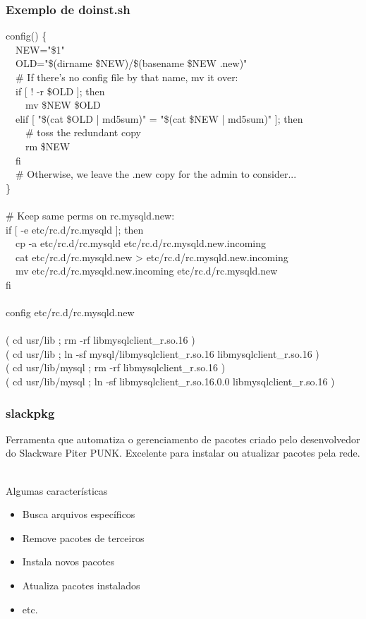 \documentclass{beamer}
\begin{document}
\begin{frame}
	\frametitle{Exemplo de doinst.sh}
	\scriptsize{
	\tiny{
	config() \{\\
  	~~NEW="\$1"\\
	~~OLD="\$(dirname \$NEW)/\$(basename \$NEW .new)"\\
	~~\# If there's no config file by that name, mv it over:\\
	~~if [ ! -r \$OLD ]; then\\
	~~~~mv \$NEW \$OLD\\
	~~elif [ "\$(cat \$OLD | md5sum)" = "\$(cat \$NEW | md5sum)" ]; then\\
        ~~~~\# toss the redundant copy\\
    	~~~~rm \$NEW\\
  	~~fi\\
  	~~\# Otherwise, we leave the .new copy for the admin to consider...\\
\}\\
~\\
	\# Keep same perms on rc.mysqld.new:\\
	if [ -e etc/rc.d/rc.mysqld ]; then\\
	~~cp -a etc/rc.d/rc.mysqld etc/rc.d/rc.mysqld.new.incoming\\
	~~cat etc/rc.d/rc.mysqld.new > etc/rc.d/rc.mysqld.new.incoming\\
	~~mv etc/rc.d/rc.mysqld.new.incoming etc/rc.d/rc.mysqld.new\\
	fi\\
~\\
	config etc/rc.d/rc.mysqld.new\\
~\\
	( cd usr/lib ; rm -rf libmysqlclient\_r.so.16 )\\
	( cd usr/lib ; ln -sf mysql/libmysqlclient\_r.so.16 libmysqlclient\_r.so.16 )\\
	( cd usr/lib/mysql ; rm -rf libmysqlclient\_r.so.16 )\\
	( cd usr/lib/mysql ; ln -sf libmysqlclient\_r.so.16.0.0 libmysqlclient\_r.so.16 )\\
	}}
\end{frame}

\begin{frame}
	\frametitle{slackpkg}
	Ferramenta que automatiza o gerenciamento de pacotes criado pelo desenvolvedor
	do Slackware Piter PUNK. Excelente para instalar ou atualizar pacotes pela
	rede.\\
	~\\
	\begin{block}{Algumas características}
		\begin{itemize}
			\item Busca arquivos específicos
			\item Remove pacotes de terceiros
			\item Instala novos pacotes
			\item Atualiza pacotes instalados
			\item etc.
		\end{itemize}
	\end{block}
\end{frame}
\end{document}
